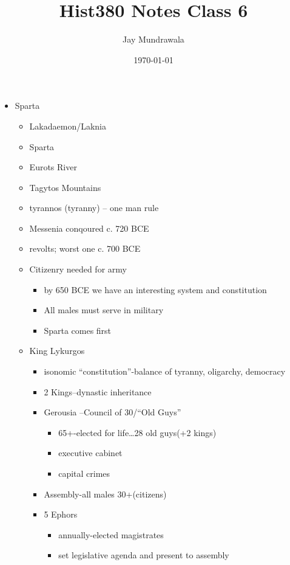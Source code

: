 \documentclass[11pt, a4paper]{article}
\begin{document}
\title{Hist380 Notes Class 6}
\author{Jay Mundrawala}
\date{\today}
\maketitle

\begin{itemize}
  \item Sparta
    \begin{itemize}
      \item Lakadaemon/Laknia
      \item Sparta
      \item Eurots River
      \item Tagytos Mountains
      \item tyrannos (tyranny) -- one man rule
      \item Messenia conqoured c. 720 BCE
      \item revolts; worst one c. 700 BCE
      \item Citizenry needed for army
        \begin{itemize}
          \item by 650 BCE we have an interesting system and constitution
          \item All males must serve in military
          \item Sparta comes first
        \end{itemize}
      \item King Lykurgos
        \begin{itemize}
          \item isonomic ``constitution''-balance of tyranny, oligarchy, democracy
          \item 2 Kings--dynastic inheritance
          \item Gerousia --Council of 30/``Old Guys''
            \begin{itemize}
              \item 65+-elected for life\dots 28 old guys(+2 kings)
              \item executive cabinet
              \item capital crimes
            \end{itemize}
          \item Assembly-all males 30+(citizens)
          \item 5 Ephors
            \begin{itemize}
              \item annually-elected magistrates
              \item set legislative agenda and present to assembly

\end{itemize}
\end{itemize}
\end{itemize}
\end{itemize}
\end{document}
